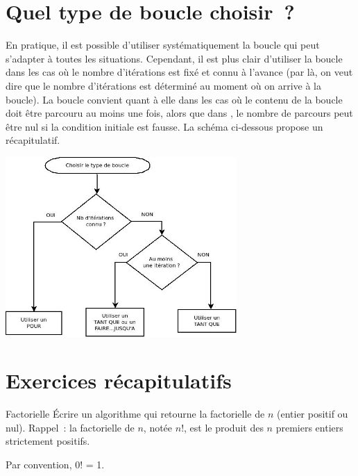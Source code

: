 \section{Quel type de boucle choisir~?}

	En pratique, il est possible d’utiliser systématiquement la boucle 
	 qui peut s’adapter à toutes les situations. 
	Cependant, il est plus clair d’utiliser la boucle  
	dans les cas où le nombre d’itérations est fixé et connu à l’avance 
	(par là, on veut dire que le nombre d’itérations est déterminé au moment 
	où on arrive à la boucle). 
	La boucle  convient quant à elle
	dans les cas où le contenu de la boucle doit être parcouru au moins une
	fois, alors que dans , 
	le nombre de parcours peut être nul si la condition initiale est fausse. 
	La schéma ci-dessous propose un récapitulatif.

	\begin{center}
		\includegraphics[width=0.66\textwidth]{image/boucle-choixtype}
		\label{fig:boucle-choix}
	\end{center}

\section{Exercices récapitulatifs}

	\begin{Exercice}{Factorielle}
		Écrire un algorithme qui retourne la factorielle de $n$ (entier positif ou
		nul). Rappel~: la factorielle de $n$, notée $n$!, est le produit des $n$
		premiers entiers strictement positifs. 
		
		Par convention, 0! = 1.
	\end{Exercice}
	
